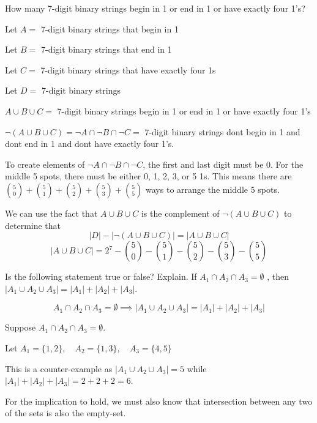 \documentclass[openany, 12pt]{book}
\begin{document}
\begin{exercise}{}{}
	How many 7-digit binary strings begin in 1 or end in 1 or have exactly four 1's?
	\begin{alist}
		\item Let $A=$ 7-digit binary strings that begin in 1
		\item Let $B=$ 7-digit binary strings that end in 1
		\item Let $C=$ 7-digit binary strings that have exactly four 1s
		\item Let $D=$ 7-digit binary strings
		\item $A\cup B \cup C=$ 7-digit binary strings begin in 1 or end in 1 or have exactly four 1's
		\item $\neg(A\cup B \cup C)=\neg A \cap \neg B \cap \neg C=$
		7-digit binary strings dont begin in 1 and dont end in 1 and dont have
		exactly four 1's.
		\item To create elements of $\neg A \cap \neg B \cap \neg C$,
		the first and last digit must be 0. For the middle 5 spots, there must
		be either 0, 1, 2, 3, or 5 1s. This means there are
		$\binom{5}{0}+\binom{5}{1}+\binom{5}{2}+\binom{5}{3}+\binom{5}{5}$ ways
		to arrange the middle 5 spots.
		\item We can use the fact that $A\cup B \cup C$ is the complement of
		$\neg(A\cup B \cup C)$ to determine that
		$$|D| - |\neg(A\cup B \cup C)|=| A\cup B \cup C |$$
		$$ | A\cup B \cup C | = 2^7 - \binom{5}{0}-\binom{5}{1}-\binom{5}{2}-\binom{5}{3}-\binom{5}{5}$$
	\end{alist}
\end{exercise}

\begin{exercise}{}{}
	Is the following statement true or false? Explain. If
	$A_1
		\cap A_2 \cap A_3 =\emptyset$ , then $|A_1 \cup A_2 \cup A_3| =
		|A_1|+|A_2|+|A_3|$.

	\begin{alist}
		\item
		$$
			A_1 \cap A_2 \cap A_3 =\emptyset
			\implies
			|A_1 \cup A_2 \cup A_3| = |A_1|+|A_2|+|A_3|
		$$
		\item Suppose $A_1 \cap A_2 \cap A_3 =\emptyset$.
		\item Let
		$A_1=\{1, 2\},\quad
			A_2=\{1, 3\},\quad
			A_3=\{4, 5\} $
		\item This is a counter-example as $|A_1 \cup A_2 \cup A_3|=5$ while
		$|A_1|+|A_2|+|A_3| = 2 +2 +2=6$.
		\item For the implication to hold, we must also know that intersection between
		any two of the sets is also the empty-set.
	\end{alist}
\end{exercise}
\end{document}
